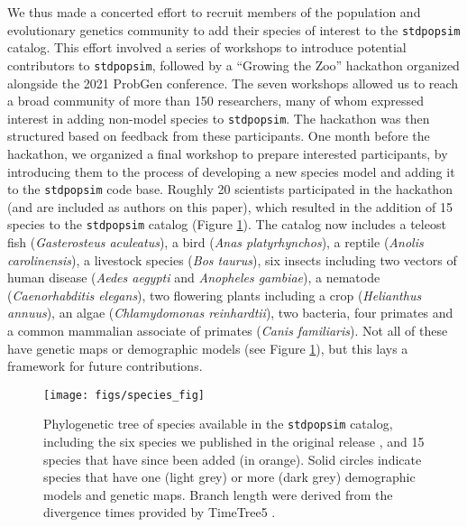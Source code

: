 \documentclass[hidelinks]{article}
\newcommand{\stdpopsim}{\texttt{stdpopsim}\xspace}
\begin{document}
We thus made a concerted effort
to recruit members of the population and evolutionary genetics community
to add their species of interest to the \stdpopsim catalog.
This effort involved a series of workshops to introduce potential contributors to \stdpopsim, followed by a ``Growing the Zoo'' hackathon organized alongside the 2021 ProbGen conference.
The seven workshops allowed us to reach a broad community of more than 150 researchers,
many of whom expressed interest in adding non-model species to \stdpopsim.
The hackathon was then structured based on feedback from these participants.
One month before the hackathon, we organized a final workshop to prepare interested
participants, by introducing them to  the process of developing
a new species model and adding it to the \stdpopsim code base.
Roughly 20 scientists participated in the hackathon (and are included as authors on this paper),
which resulted in the addition of 15 species to the \stdpopsim catalog
(Figure \ref{fig:tree}).
The catalog now includes
a teleost fish (\textit{Gasterosteus aculeatus}),
a bird (\textit{Anas platyrhynchos}),
a reptile (\textit{Anolis carolinensis}),
a livestock species (\textit{Bos taurus}),
six insects including two vectors of human disease (\textit{Aedes aegypti} and \textit{Anopheles gambiae}),
a nematode (\textit{Caenorhabditis elegans}),
two flowering plants including a crop (\textit{Helianthus annuus}),
an algae (\textit{Chlamydomonas reinhardtii}),
two bacteria,
four primates and a common mammalian associate of primates (\textit{Canis familiaris}).
Not all of these have genetic maps or demographic models (see Figure \ref{fig:tree}),
but this lays a framework for future contributions.
\begin{figure}
    \texttt{[image: figs/species\_fig]}
	\caption{Phylogenetic tree of species available in the \stdpopsim catalog,
		including the six species we published in the original release \citep[in blue]{Adrion2020}, and 15 species that have since been added (in orange).
		Solid circles indicate species that have one (light grey) or more
		(dark grey) demographic models and genetic maps.
		Branch length were derived from the divergence times provided by TimeTree5 \citep{Kumar2022}.
	\label{fig:tree} }
\end{figure}
\end{document}

